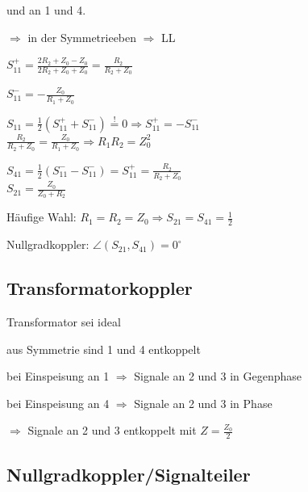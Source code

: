 \cp und \cm an 1 und 4.\\


\cp $\Rightarrow$ in der Symmetrieeben $\Rightarrow$ LL
\begin{pitemize}
    \item {}
    \item $S_{11}^+ = \frac{2R_2 + Z_0 - Z_0}{2 R_2 + Z_0 + Z_0} = \frac{R_2}{R_2+Z_0}$
\end{pitemize}

\cm
\begin{pitemize}
    \item {}
    \item $S_{11}^- = -\frac{Z_0}{R_1 + Z_0}$
\end{pitemize}

$S_{11} = \frac{1}{2}(S_{11}^+ + S_{11}^-) \overset{!}{=} 0 \Rightarrow S_{11}^+ = -S_{11}^-$ \\
$\frac{R_2}{R_2 + Z_0} = \frac{Z_0}{R_1 + Z_0} \Rightarrow R_1R_2 = Z_0^2$

$S_{41} = \frac{1}{2}(S_{11}^--S_{11}^-) = S_{11}^+ = \frac{R_2}{R_2 + Z_0}$\\
$S_{21} = \frac{Z_0}{Z_0 + R_2}$


Häufige Wahl: $R_1 = R_2 = Z_0 \Rightarrow S_{21}=S_{41} = \frac{1}{2}$

Nullgradkoppler: $\angle(S_{21}, S_{41}) = 0^\circ$

\subsection{Transformatorkoppler}


\begin{pitemize}
    \item Transformator sei ideal
    \item aus Symmetrie sind 1 und 4 entkoppelt
    \item bei Einspeisung an 1 $\Rightarrow$ Signale an 2 und 3 in Gegenphase
    \item bei Einspeisung an 4 $\Rightarrow$ Signale an 2 und 3 in Phase
    \item $\Rightarrow$ Signale an 2 und 3 entkoppelt mit $Z = \frac{Z_0}{2}$
\end{pitemize}


\subsection{Nullgradkoppler/Signalteiler}

